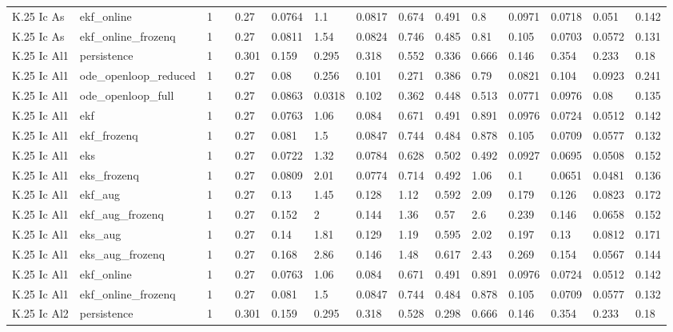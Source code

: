 \begin{table}[t]
\begin{tabular}{lllllllllllllll}
K.25 Ic As & ekf\_online & 1 &  & 0.27 & 0.0764 & 1.1 & 0.0817 & 0.674 & 0.491 & 0.8 & 0.0971 & 0.0718 & 0.051 & 0.142 \\
K.25 Ic As & ekf\_online\_frozenq & 1 &  & 0.27 & 0.0811 & 1.54 & 0.0824 & 0.746 & 0.485 & 0.81 & 0.105 & 0.0703 & 0.0572 & 0.131 \\
K.25 Ic Al1 & persistence & 1 &  & 0.301 & 0.159 & 0.295 & 0.318 & 0.552 & 0.336 & 0.666 & 0.146 & 0.354 & 0.233 & 0.18 \\
K.25 Ic Al1 & ode\_openloop\_reduced & 1 &  & 0.27 & 0.08 & 0.256 & 0.101 & 0.271 & 0.386 & 0.79 & 0.0821 & 0.104 & 0.0923 & 0.241 \\
K.25 Ic Al1 & ode\_openloop\_full & 1 &  & 0.27 & 0.0863 & 0.0318 & 0.102 & 0.362 & 0.448 & 0.513 & 0.0771 & 0.0976 & 0.08 & 0.135 \\
K.25 Ic Al1 & ekf & 1 &  & 0.27 & 0.0763 & 1.06 & 0.084 & 0.671 & 0.491 & 0.891 & 0.0976 & 0.0724 & 0.0512 & 0.142 \\
K.25 Ic Al1 & ekf\_frozenq & 1 &  & 0.27 & 0.081 & 1.5 & 0.0847 & 0.744 & 0.484 & 0.878 & 0.105 & 0.0709 & 0.0577 & 0.132 \\
K.25 Ic Al1 & eks & 1 &  & 0.27 & 0.0722 & 1.32 & 0.0784 & 0.628 & 0.502 & 0.492 & 0.0927 & 0.0695 & 0.0508 & 0.152 \\
K.25 Ic Al1 & eks\_frozenq & 1 &  & 0.27 & 0.0809 & 2.01 & 0.0774 & 0.714 & 0.492 & 1.06 & 0.1 & 0.0651 & 0.0481 & 0.136 \\
K.25 Ic Al1 & ekf\_aug & 1 &  & 0.27 & 0.13 & 1.45 & 0.128 & 1.12 & 0.592 & 2.09 & 0.179 & 0.126 & 0.0823 & 0.172 \\
K.25 Ic Al1 & ekf\_aug\_frozenq & 1 &  & 0.27 & 0.152 & 2 & 0.144 & 1.36 & 0.57 & 2.6 & 0.239 & 0.146 & 0.0658 & 0.152 \\
K.25 Ic Al1 & eks\_aug & 1 &  & 0.27 & 0.14 & 1.81 & 0.129 & 1.19 & 0.595 & 2.02 & 0.197 & 0.13 & 0.0812 & 0.171 \\
K.25 Ic Al1 & eks\_aug\_frozenq & 1 &  & 0.27 & 0.168 & 2.86 & 0.146 & 1.48 & 0.617 & 2.43 & 0.269 & 0.154 & 0.0567 & 0.144 \\
K.25 Ic Al1 & ekf\_online & 1 &  & 0.27 & 0.0763 & 1.06 & 0.084 & 0.671 & 0.491 & 0.891 & 0.0976 & 0.0724 & 0.0512 & 0.142 \\
K.25 Ic Al1 & ekf\_online\_frozenq & 1 &  & 0.27 & 0.081 & 1.5 & 0.0847 & 0.744 & 0.484 & 0.878 & 0.105 & 0.0709 & 0.0577 & 0.132 \\
K.25 Ic Al2 & persistence & 1 &  & 0.301 & 0.159 & 0.295 & 0.318 & 0.528 & 0.298 & 0.666 & 0.146 & 0.354 & 0.233 & 0.18 \\

\end{tabular}
\end{table}
